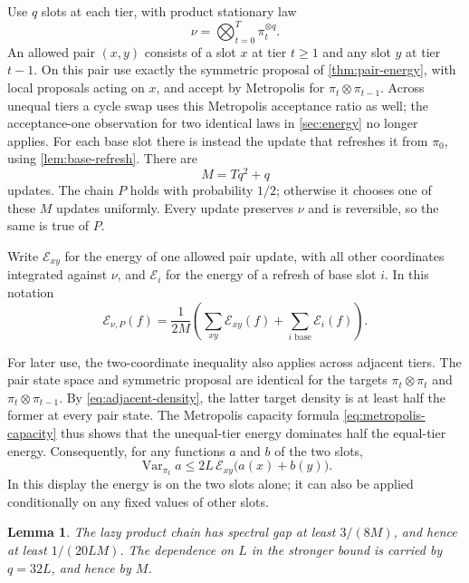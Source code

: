 \documentclass[11pt]{article}
\newtheorem{lemma}[theorem]{Lemma}
\theoremstyle{definition}
\theoremstyle{remark}
\DeclareMathOperator{\Var}{Var}
\newcommand{\calE}{\mathcal E}
\numberwithin{equation}{section}
\begin{document}
Use $q$ slots at each tier, with product stationary law
\[
 \nu=\bigotimes_{t=0}^T\pi_t^{\otimes q}.
\]
An allowed pair $(x,y)$ consists of a slot $x$ at tier $t\ge1$ and
any slot $y$ at tier $t-1$. On this pair use exactly the symmetric
proposal of \cref{thm:pair-energy}, with local proposals acting on
$x$, and accept by Metropolis for $\pi_t\otimes\pi_{t-1}$.
Across unequal tiers a cycle swap uses this Metropolis acceptance
ratio as well; the acceptance-one observation for two identical laws
in \cref{sec:energy} no longer applies. For each base slot there is
instead the update that refreshes it from $\pi_0$, using
\cref{lem:base-refresh}. There are
\begin{equation}\label{eq:ladder-update-count}
 M=Tq^2+q
\end{equation}
updates. The chain $P$ holds with probability $1/2$; otherwise it
chooses one of these $M$ updates uniformly. Every update preserves
$\nu$ and is reversible, so the same is true of $P$.

Write $\calE_{xy}$ for the energy of one allowed pair update, with
all other coordinates integrated against $\nu$, and $\calE_i$ for
the energy of a refresh of base slot $i$. In this notation
\begin{equation}\label{eq:ladder-scan-energy}
 \calE_{\nu,P}(f)
   =\frac1{2M}\left(\sum_{xy}\calE_{xy}(f)
                         +\sum_{i\text{ base}}\calE_i(f)\right).
\end{equation}

For later use, the two-coordinate inequality also applies across
adjacent tiers. The pair state space and symmetric proposal are
identical for the targets $\pi_t\otimes\pi_t$ and
$\pi_t\otimes\pi_{t-1}$. By \cref{eq:adjacent-density}, the latter
target density is at least half the former at every pair state.
The Metropolis capacity formula \cref{eq:metropolis-capacity} thus
shows that the unequal-tier energy dominates half the equal-tier
energy. Consequently, for any functions $a$ and $b$ of the two slots,
\begin{equation}\label{eq:unequal-pair-energy}
 \Var_{\pi_t}a
 \le 2L\,\calE_{xy}\bigl(a(x)+b(y)\bigr).
\end{equation}
In this display the energy is on the two slots alone; it can also be
applied conditionally on any fixed values of other slots.

\begin{lemma}\label{lem:replica-gap}
The lazy product chain has spectral gap at least $3/(8M)$, and hence
at least $1/(20LM)$. The dependence on $L$ in the stronger bound
is carried by $q=32L$, and hence by $M$.
\end{lemma}
\end{document}
